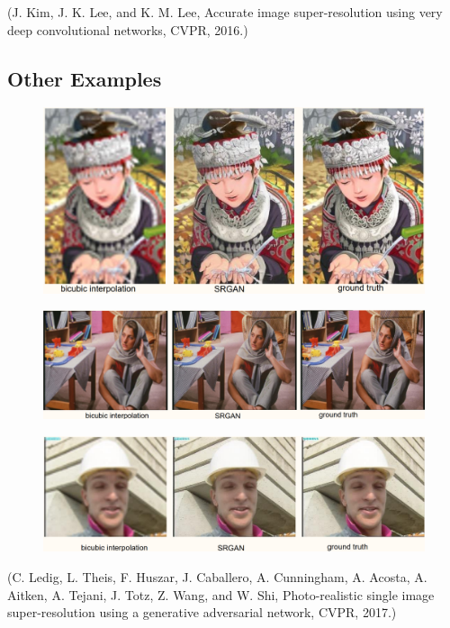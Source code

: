\begin{definition}[8.7][VDSR]
    (J. Kim, J. K. Lee, and K. M. Lee, Accurate image super-resolution using very deep convolutional networks, CVPR, 2016.)
\end{definition}

\subsection{Other Examples}

\begin{example}[8.8][SRGAN]
    \begin{figure}[H]
        \centering
        \includegraphics[width=1.0\textwidth]{.././assets/8.7.png}
    \end{figure}

    \begin{figure}[H]
        \centering
        \includegraphics[width=1.0\textwidth]{.././assets/8.8.png}
    \end{figure}

    \begin{figure}[H]
        \centering
        \includegraphics[width=1.0\textwidth]{.././assets/8.9.png}
    \end{figure}

    (C. Ledig, L. Theis, F. Huszar, J. Caballero, A. Cunningham, A. Acosta, A. Aitken, A. Tejani, J. Totz, Z. Wang, and W. Shi, Photo-realistic single image super-resolution using a generative adversarial network, CVPR, 2017.)
\end{example}

